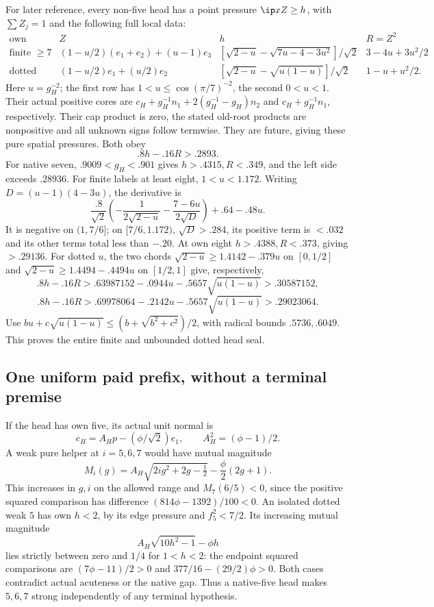 For later reference, every non-five head has a point pressure
\(\ip xZ\geq h\), with \(\sum Z_j=1\) and the following
full local data:
\[
\begin{array}{c|c|c|c}
\text{own}&Z&h&R=Z^2\\ \hline
\text{finite }\geq7&
 (1-u/2)(e_1+e_2)+(u-1)e_3&
 [\sqrt{2-u}-\sqrt{7u-4-3u^2}]/\sqrt2&
 3-4u+3u^2/2\\
\text{dotted}&(1-u/2)e_1+(u/2)e_2&
 [\sqrt{2-u}-\sqrt{u(1-u)}]/\sqrt2&
 1-u+u^2/2 .
\end{array}
\]
Here \(u=g_H^{-2}\); the first row has
\(1<u\leq\cos(\pi/7)^{-2}\), the second \(0<u<1\).
Their actual positive cores are
\(c_H+g_H^{-1}n_1+2(g_H^{-1}-g_H)n_2\)
and \(c_H+g_H^{-1}n_1\), respectively.
Their cap product is zero, the stated old-root products are
nonpositive and all unknown signs follow termwise.
They are future, giving these pure spatial pressures.
Both obey
\begin{equation}\label{app:eq:B18headF}
 .8h-.16R>.2893.
\end{equation}
For native seven, \(.9009<g_H<.901\) gives \(h>.4315,R<.349\),
and the left side exceeds \(.28936\).
For finite labels at least eight, \(1<u<1.172\).
Writing \(D=(u-1)(4-3u)\), the derivative is
\[
 \frac{.8}{\sqrt2}\left(-\frac1{2\sqrt{2-u}}
                 -\frac{7-6u}{2\sqrt D}\right)+.64-.48u.
\]
It is negative on \((1,7/6]\); on \([7/6,1.172)\),
\(\sqrt D>.284\), its positive term is \(<.032\)
and its other terms total less than \(-.20\).
At own eight \(h>.4388,R<.373\), giving \(>.29136\).
For dotted \(u\), the two chords
\(\sqrt{2-u}\geq1.4142-.379u\) on \([0,1/2]\) and
\(\sqrt{2-u}\geq1.4494-.4494u\) on \([1/2,1]\)
give, respectively,
\[
 .8h-.16R>
 .63987152-.0944u-.5657\sqrt{u(1-u)}>.30587152,
\]
\[
 .8h-.16R>
 .69978064-.2142u-.5657\sqrt{u(1-u)}>.29023064.
\]
Use
\(bu+c\sqrt{u(1-u)}\leq(b+\sqrt{b^2+c^2})/2\),
with radical bounds \(.5736,.6049\).
This proves the entire finite and unbounded dotted head seal.

\subsection{One uniform paid prefix, without a terminal premise}
\label{app:B18paidprefix}
If the head has own five, its actual unit normal is
\[
 c_H=A_Hp-(\phi/\sqrt2)e_1,\qquad A_H^2=(\phi-1)/2.
\]
A weak pure helper at \(i=5,6,7\) would have mutual magnitude
\[
 M_i(g)=A_H\sqrt{2ig^2+2g-\tfrac12}
             -\frac\phi2(2g+1).
\]
This increases in \(g,i\) on the allowed range and
\(M_7(6/5)<0\), since the positive squared comparison has
difference \((814\phi-1392)/100<0\).
An isolated dotted weak \(5\) has own \(h<2\), by its edge
pressure and \(f_5^2<7/2\). Its increasing mutual magnitude
\[
 A_H\sqrt{10h^2-1}-\phi h
\]
lies strictly between zero and \(1/4\) for \(1<h<2\):
the endpoint squared comparisons are
\((7\phi-11)/2>0\) and \(377/16-(29/2)\phi>0\).
Both cases contradict actual acuteness or the native gap.
Thus a native-five head makes \(5,6,7\) strong independently
of any terminal hypothesis.

